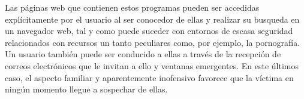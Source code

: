 \documentclass[12pt]{article}
\newcommand{\newpar} {
    \vskip 1cm
}
\begin{document}
            \newpar

            Las páginas web que contienen estos programas pueden ser accedidas explícitamente por el usuario al ser conocedor de ellas y realizar su busqueda en un navegador web, tal y como puede suceder con entornos de escasa seguridad relacionados con recursos un tanto peculiares como, por ejemplo, la pornografía. Un usuario también puede ser conducido a ellas a través de la recepción de correos electrónicos que le invitan a ello y ventanas emergentes. En este últimos caso, el aspecto familiar y aparentemente inofensivo favorece que la víctima en ningún momento llegue a sospechar de ellas.
\end{document}
